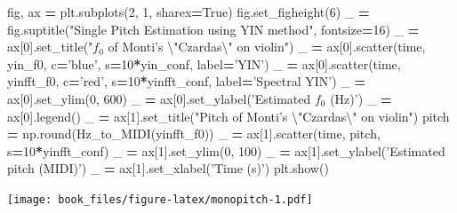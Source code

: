 \documentclass[american,]{article}
\newenvironment{Shaded}{\begin{snugshade}}{\end{snugshade}}
\newcommand{\BuiltInTok}[1]{#1}
\newcommand{\CharTok}[1]{\textcolor[rgb]{0.31,0.60,0.02}{#1}}
\newcommand{\DecValTok}[1]{\textcolor[rgb]{0.00,0.00,0.81}{#1}}
\newcommand{\NormalTok}[1]{#1}
\newcommand{\OperatorTok}[1]{\textcolor[rgb]{0.81,0.36,0.00}{\textbf{#1}}}
\newcommand{\StringTok}[1]{\textcolor[rgb]{0.31,0.60,0.02}{#1}}
\newcommand{\VariableTok}[1]{\textcolor[rgb]{0.00,0.00,0.00}{#1}}
\begin{document}
\begin{Shaded}
\begin{Highlighting}[]
\NormalTok{fig, ax }\OperatorTok{=}\NormalTok{ plt.subplots(}\DecValTok{2}\NormalTok{, }\DecValTok{1}\NormalTok{, sharex}\OperatorTok{=}\VariableTok{True}\NormalTok{)}
\NormalTok{fig.set_figheight(}\DecValTok{6}\NormalTok{)}
\NormalTok{_ }\OperatorTok{=}\NormalTok{ fig.suptitle(}\StringTok{"Single Pitch Estimation using YIN method"}\NormalTok{, fontsize}\OperatorTok{=}\DecValTok{16}\NormalTok{)}
\NormalTok{_ }\OperatorTok{=}\NormalTok{ ax[}\DecValTok{0}\NormalTok{].set_title(}\StringTok{"$f_0$ of Monti's }\CharTok{\textbackslash{}"}\StringTok{Czardas}\CharTok{\textbackslash{}"}\StringTok{ on violin"}\NormalTok{)}
\NormalTok{_ }\OperatorTok{=}\NormalTok{ ax[}\DecValTok{0}\NormalTok{].scatter(time, yin_f0, c}\OperatorTok{=}\StringTok{'blue'}\NormalTok{, s}\OperatorTok{=}\DecValTok{10}\OperatorTok{*}\NormalTok{yin_conf, label}\OperatorTok{=}\StringTok{'YIN'}\NormalTok{)}
\NormalTok{_ }\OperatorTok{=}\NormalTok{ ax[}\DecValTok{0}\NormalTok{].scatter(time, yinfft_f0, c}\OperatorTok{=}\StringTok{'red'}\NormalTok{, s}\OperatorTok{=}\DecValTok{10}\OperatorTok{*}\NormalTok{yinfft_conf, label}\OperatorTok{=}\StringTok{'Spectral YIN'}\NormalTok{)}
\NormalTok{_ }\OperatorTok{=}\NormalTok{ ax[}\DecValTok{0}\NormalTok{].set_ylim(}\DecValTok{0}\NormalTok{, }\DecValTok{600}\NormalTok{)}
\NormalTok{_ }\OperatorTok{=}\NormalTok{ ax[}\DecValTok{0}\NormalTok{].set_ylabel(}\StringTok{'Estimated $f_0$ (Hz)'}\NormalTok{)}
\NormalTok{_ }\OperatorTok{=}\NormalTok{ ax[}\DecValTok{0}\NormalTok{].legend()}
\NormalTok{_ }\OperatorTok{=}\NormalTok{ ax[}\DecValTok{1}\NormalTok{].set_title(}\StringTok{"Pitch of Monti's }\CharTok{\textbackslash{}"}\StringTok{Czardas}\CharTok{\textbackslash{}"}\StringTok{ on violin"}\NormalTok{)}
\NormalTok{pitch }\OperatorTok{=}\NormalTok{ np.}\BuiltInTok{round}\NormalTok{(Hz_to_MIDI(yinfft_f0))}
\NormalTok{_ }\OperatorTok{=}\NormalTok{ ax[}\DecValTok{1}\NormalTok{].scatter(time, pitch, s}\OperatorTok{=}\DecValTok{10}\OperatorTok{*}\NormalTok{yinfft_conf)}
\NormalTok{_ }\OperatorTok{=}\NormalTok{ ax[}\DecValTok{1}\NormalTok{].set_ylim(}\DecValTok{0}\NormalTok{, }\DecValTok{100}\NormalTok{)}
\NormalTok{_ }\OperatorTok{=}\NormalTok{ ax[}\DecValTok{1}\NormalTok{].set_ylabel(}\StringTok{'Estimated pitch (MIDI)'}\NormalTok{)}
\NormalTok{_ }\OperatorTok{=}\NormalTok{ ax[}\DecValTok{1}\NormalTok{].set_xlabel(}\StringTok{'Time (s)'}\NormalTok{)}
\NormalTok{plt.show()}
\end{Highlighting}
\end{Shaded}

\texttt{[image: book\_files/figure-latex/monopitch-1.pdf]}
\end{document}
